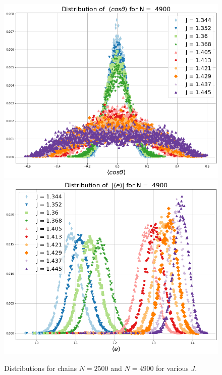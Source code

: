 \begin{figure}
 	\\
 	\includegraphics[scale=0.25]{Images/distr_cos_4900.png}
 	\includegraphics[scale=0.25]{Images/distr_energy_4900.png}
 	\caption{ Distributions for chains $N=2500$ and $N=4900$ for various $J$.    }
 	\label{fig:distributions}
 \end{figure}
%
%
%

